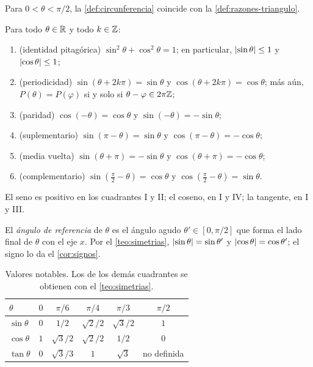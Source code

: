 \addtocounter{figure}{1}%

\begin{proposicion}\label{prop:coherencia}
Para $0<\theta<\pi/2$, la \cref{def:circunferencia} coincide con la \cref{def:razones-triangulo}.
\end{proposicion}

\begin{teorema}\label{teo:simetrias}
Para todo $\theta\in\mathbb{R}$ y todo $k\in\mathbb{Z}$:
\begin{enumerate}
  \item (identidad pitagórica) $\sin^{2}\theta+\cos^{2}\theta=1$; en particular, $\lvert\sin\theta\rvert\le 1$ y $\lvert\cos\theta\rvert\le 1$;
  \item (periodicidad) $\sin(\theta+2k\pi)=\sin\theta$ y $\cos(\theta+2k\pi)=\cos\theta$; más aún, $P(\theta)=P(\varphi)$ si y solo si $\theta-\varphi\in2\pi\mathbb{Z}$;
  \item (paridad) $\cos(-\theta)=\cos\theta$ y $\sin(-\theta)=-\sin\theta$;
  \item (suplementario) $\sin(\pi-\theta)=\sin\theta$ y $\cos(\pi-\theta)=-\cos\theta$;
  \item (media vuelta) $\sin(\theta+\pi)=-\sin\theta$ y $\cos(\theta+\pi)=-\cos\theta$;
  \item (complementario) $\sin(\tfrac{\pi}{2}-\theta)=\cos\theta$ y $\cos(\tfrac{\pi}{2}-\theta)=\sin\theta$.
\end{enumerate}
\end{teorema}

\begin{corolario}\label{cor:signos}
El seno es positivo en los cuadrantes I y II; el coseno, en I y IV; la tangente, en I y III.
\end{corolario}

\begin{definicion}
El \emph{ángulo de referencia} de $\theta$ es el ángulo agudo $\theta'\in[0,\pi/2]$ que forma el lado final de $\theta$ con el eje $x$. Por el \cref{teo:simetrias}, $\lvert\sin\theta\rvert=\sin\theta'$ y $\lvert\cos\theta\rvert=\cos\theta'$; el signo lo da el \cref{cor:signos}.
\end{definicion}

\addtocounter{definicion}{1}%

\begin{table}[ht]
\centering\small
\caption{Valores notables. Los de los demás cuadrantes se obtienen con el \cref{teo:simetrias}.}\label{tab:notables}
\begin{tabular}{@{}lccccc@{}}
\toprule
$\theta$ & $0$ & $\pi/6$ & $\pi/4$ & $\pi/3$ & $\pi/2$ \\
\midrule
$\sin\theta$ & $0$ & $1/2$ & $\sqrt2/2$ & $\sqrt3/2$ & $1$ \\
$\cos\theta$ & $1$ & $\sqrt3/2$ & $\sqrt2/2$ & $1/2$ & $0$ \\
$\tan\theta$ & $0$ & $\sqrt3/3$ & $1$ & $\sqrt3$ & no definida \\
\bottomrule
\end{tabular}
\end{table}

\addtocounter{definicion}{1}%

\addtocounter{definicion}{1}%

